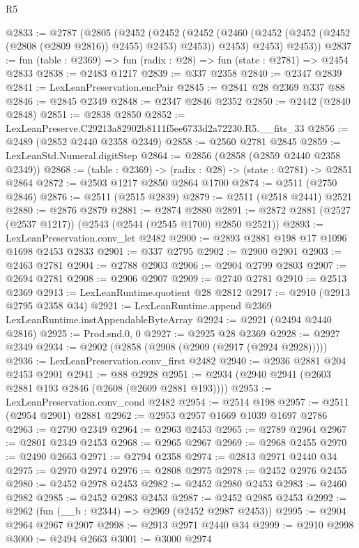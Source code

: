 \begin{lexlean}{R5}
\begin{coremodule}
@2833 := @2787
    (@2805
      (@2452
        (@2452
          (@2452 (@2460 (@2452 (@2452 (@2452 (@2808 (@2809 @2816)) @2455) @2453) @2453)) @2453)
          @2453)
        @2453))
@2837 := fun (table : @2369) => fun (radix : @28) => fun (state : @2781) => @2454 @2833
@2838 := @2483 @1217
@2839 := @337 @2358
@2840 := @2347 @2839
@2841 := LexLeanPreservation.encPair
@2845 := @2841 @28 @2369 @337 @88
@2846 := @2845 @2349
@2848 := @2347 @2846 @2352
@2850 := @2442 (@2840 @2848)
@2851 := @2838 @2850
@2852 := LexLeanPreserve.C29213a82902b8111f5ee6733d2a72230.R5.__fits_33
@2856 := @2489 (@2852 @2440 @2358 @2349)
@2858 := @2560 @2781 @2845
@2859 := LexLeanStd.Numeral.digitStep
@2864 := @2856 (@2858 (@2859 @2440 @2358 @2349))
@2868 := (table : @2369) -> (radix : @28) -> (state : @2781) -> @2851 @2864
@2872 := @2503 @1217 @2850 @2864 @1700
@2874 := @2511 (@2750 @2846)
@2876 := @2511 (@2515 @2839)
@2879 := @2511 (@2518 @2441) @2521
@2880 := @2876 @2879
@2881 := @2874 @2880
@2891 := @2872 @2881 (@2527 (@2537 @1217)) (@2543 (@2544 (@2545 @1700) @2850 @2521))
@2893 := LexLeanPreservation.conv_let @2482
@2900 := @2893 @2881 @198 @17 @1096 @1698 @2453 @2833
@2901 := @337 @2795
@2902 := @2900 @2901
@2903 := @2463 @2781
@2904 := @2788 @2903
@2906 := @2904 @2799 @2803
@2907 := @2694 @2781
@2908 := @2906 @2907
@2909 := @2740 @2781
@2910 := @2513 @2369
@2913 := LexLeanRuntime.quotient @28 @2812
@2917 := @2910 (@2913 @2795 @2358 @34)
@2921 := LexLeanRuntime.append @2369 LexLeanRuntime.instAppendableByteArray
@2924 := @2921 (@2494 @2440 @2816)
@2925 := Prod.snd.{0, 0}
@2927 := @2925 @28 @2369
@2928 := @2927 @2349
@2934 := @2902 (@2858 (@2908 (@2909 (@2917 (@2924 @2928)))))
@2936 := LexLeanPreservation.conv_first @2482
@2940 := @2936 @2881 @204 @2453 @2901
@2941 := @88 @2928
@2951 := @2934 (@2940 @2941 (@2603 @2881 @193 @2846 (@2608 (@2609 @2881 @193))))
@2953 := LexLeanPreservation.conv_cond @2482
@2954 := @2514 @198
@2957 := @2511 (@2954 @2901) @2881
@2962 := @2953 @2957 @1669 @1039 @1697 @2786
@2963 := @2790 @2349
@2964 := @2963 @2453
@2965 := @2789 @2964
@2967 := @2801 @2349 @2453
@2968 := @2965 @2967
@2969 := @2968 @2455
@2970 := @2490 @2663
@2971 := @2794 @2358
@2974 := @2813 @2971 @2440 @34
@2975 := @2970 @2974
@2976 := @2808 @2975
@2978 := @2452 @2976 @2455
@2980 := @2452 @2978 @2453
@2982 := @2452 @2980 @2453
@2983 := @2460 @2982
@2985 := @2452 @2983 @2453
@2987 := @2452 @2985 @2453
@2992 := @2962 (fun (__b : @2344) => @2969 (@2452 @2987 @2453))
@2995 := @2904 @2964 @2967 @2907
@2998 := @2913 @2971 @2440 @34
@2999 := @2910 @2998
@3000 := @2494 @2663
@3001 := @3000 @2974

\end{coremodule}
\end{lexlean}
